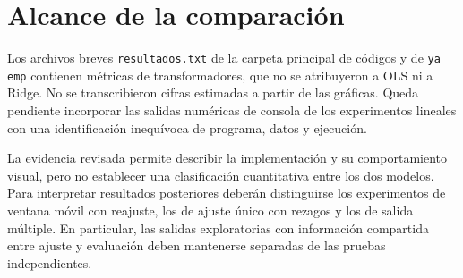 \section{Alcance de la comparación}

Los archivos breves \texttt{resultados.txt} de la carpeta principal de códigos y de \texttt{ya emp} contienen métricas de transformadores, que no se atribuyeron a OLS ni a Ridge. No se transcribieron cifras estimadas a partir de las gráficas. Queda pendiente incorporar las salidas numéricas de consola de los experimentos lineales con una identificación inequívoca de programa, datos y ejecución.

La evidencia revisada permite describir la implementación y su comportamiento visual, pero no establecer una clasificación cuantitativa entre los dos modelos. Para interpretar resultados posteriores deberán distinguirse los experimentos de ventana móvil con reajuste, los de ajuste único con rezagos y los de salida múltiple. En particular, las salidas exploratorias con información compartida entre ajuste y evaluación deben mantenerse separadas de las pruebas independientes.
